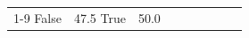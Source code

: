 \begin{table}[H]
\begin{tabular}{lllrlllll}
\cline{1-9}
False & 47.5%
\cline{1-9}
True & 50.0%

\end{tabular}
\end{table}
